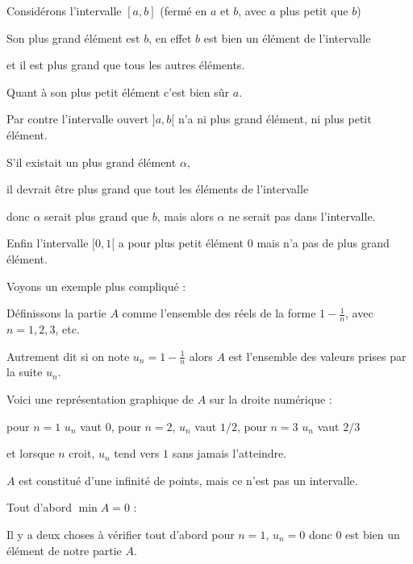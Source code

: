 \change

Considérons l'intervalle $[a,b]$ (fermé en $a$ et $b$, avec $a$ plus petit que $b$)

Son plus grand élément est $b$, en effet $b$ est bien un élément de l'intervalle

et il est plus grand que tous les autres éléments.

Quant à son plus petit élément c'est bien sûr $a$.

\change

Par contre l'intervalle ouvert $]a,b[$ n'a ni plus grand élément, ni plus petit élément.

S'il existait un plus grand élément $\alpha$, 

il devrait être plus grand que tout les éléments de l'intervalle

donc $\alpha$ serait plus grand que $b$, mais alors $\alpha$ ne serait pas dans l'intervalle.

\change

Enfin l'intervalle $[0,1[$ a pour plus petit élément $0$ mais n'a pas de plus grand élément.




\diapo

Voyons un exemple plus compliqué :

Définissons la partie  $A$ comme l'ensemble des réels de la forme $1-\frac{1}{n}$,
avec $n=1,2,3$, etc.

\change

Autrement dit si on note $u_n=1-\frac{1}{n}$ alors $A$ est l'ensemble des valeurs prises par la suite $u_n$.

\change



Voici une représentation graphique de $A$ sur la droite numérique :

pour $n=1$ $u_n$ vaut $0$, pour $n=2$, $u_n $ vaut $1/2$, pour $n=3$ $u_n$ vaut $2/3$ 

et lorsque $n$ croit, $u_n$ tend vers $1$ sans jamais l'atteindre.

$A$ est constitué d'une infinité de points, mais ce n'est pas un intervalle.


\change

Tout d'abord  $\min A=0$ :

\change

 Il y a deux choses à vérifier tout d'abord pour $n=1$, $u_n=0$ donc $0$ est bien un élément de notre partie $A$.

